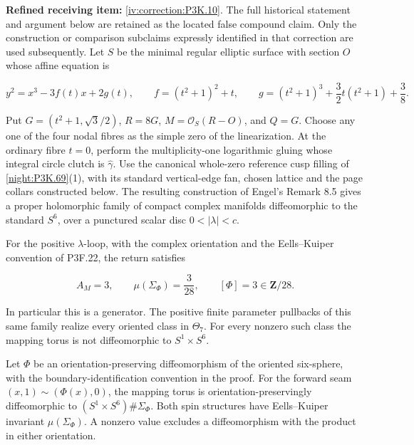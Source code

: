 \begin{theorem}\hypertarget{tag-02T5}{}\label{night:P3K.10}

\par\noindent\textbf{Refined receiving item:} \cref{iv:correction:P3K.10}. The full historical statement and argument below are retained as the located false compound claim. Only the construction or comparison subclaims expressly identified in that correction are used subsequently.
Let \(S\) be the minimal regular elliptic surface with section \(O\)
whose affine equation is

\[
 y^2=x^3-3f(t)x+2g(t),\qquad
 f=(t^2+1)^2+t,\qquad
 g=(t^2+1)^3+\frac32t(t^2+1)+\frac38.
\]

Put \(G=(t^2+1,\sqrt3/2)\), \(R=8G\),
\(M=\mathcal O_S(R-O)\), and \(Q=G\).  Choose any one of the four
nodal fibres as the simple zero of the linearization.  At the
ordinary fibre \(t=0\), perform the multiplicity-one logarithmic
gluing whose integral circle clutch is \(\widehat\gamma\).
Use the canonical whole-zero reference cusp filling of
\cref{night:P3K.69}(1), with its standard vertical-edge fan,
chosen lattice and the page collars constructed below.
The resulting construction of Engel's Remark 8.5 gives a proper
holomorphic family of compact complex manifolds diffeomorphic to
the standard \(S^6\), over a punctured scalar disc
\(0<|\lambda|<c\).

For the positive \(\lambda\)-loop, with the complex orientation and
the Eells--Kuiper convention of P3F.22, the return satisfies

\[
 A_M=3,\qquad \mu(\Sigma_\Phi)=\frac3{28},\qquad
 [\Phi]=3\in\mathbf Z/28.
\]

In particular this is a generator.  The positive finite parameter
pullbacks of this same family realize every oriented class in
\(\Theta_7\).  For every nonzero such class the mapping torus is
not diffeomorphic to \(S^1\times S^6\).
\end{theorem}

\begin{theorem}\hypertarget{tag-02S0}{}\label{night:P3F.24}

Let \(\Phi\) be an orientation-preserving diffeomorphism of the oriented six-sphere, with the boundary-identification convention in the proof. For the forward seam \((x,1)\sim(\Phi(x),0)\), the mapping torus is orientation-preservingly diffeomorphic to \((S^1\times S^6)\#\Sigma_\Phi\). Both spin structures have Eells--Kuiper invariant \(\mu(\Sigma_\Phi)\). A nonzero value excludes a diffeomorphism with the product in either orientation.
\end{theorem}

